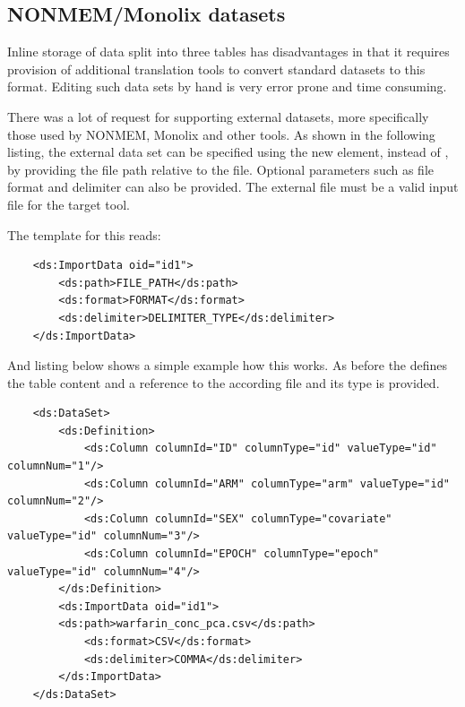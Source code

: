 \subsection{NONMEM/Monolix datasets}
\label{subsec:externalDataset}
Inline storage of data split into three tables has disadvantages in that 
it requires provision of additional translation tools to convert standard 
datasets to this format. Editing such data sets by hand is 
very error prone and time consuming.

There was a lot of request for supporting external datasets, more specifically
those used by NONMEM, Monolix and other tools. 
As shown in the following listing, the external data set can be specified using the 
new  element, instead of , by providing the file 
path relative to the \pml file. Optional parameters such as file format and 
delimiter can also be provided. The external file must be a valid input file for the target tool.


The template for this reads: 
\lstset{language=XML}
\begin{lstlisting}
    <ds:ImportData oid="id1">
        <ds:path>FILE_PATH</ds:path>
        <ds:format>FORMAT</ds:format>
        <ds:delimiter>DELIMITER_TYPE</ds:delimiter>
    </ds:ImportData>
    \end{lstlisting}
And listing below shows a simple example how this works. As before the 
defines the table content and a reference to the according file and its type is provided.
\lstset{language=XML}
\begin{lstlisting}
    <ds:DataSet>
        <ds:Definition>
            <ds:Column columnId="ID" columnType="id" valueType="id" columnNum="1"/>
            <ds:Column columnId="ARM" columnType="arm" valueType="id" columnNum="2"/>
            <ds:Column columnId="SEX" columnType="covariate" valueType="id" columnNum="3"/>
            <ds:Column columnId="EPOCH" columnType="epoch" valueType="id" columnNum="4"/>
        </ds:Definition>
    	<ds:ImportData oid="id1">
	    <ds:path>warfarin_conc_pca.csv</ds:path>
            <ds:format>CSV</ds:format>
            <ds:delimiter>COMMA</ds:delimiter>
        </ds:ImportData>
    </ds:DataSet>
\end{lstlisting}

